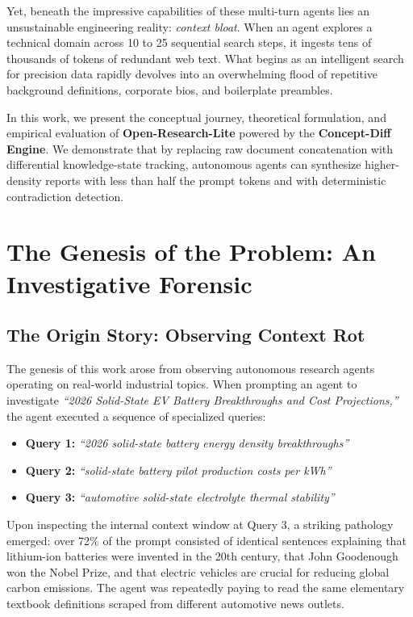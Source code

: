 \documentclass[10pt,twocolumn,letterpaper]{article}
\begin{document}
Yet, beneath the impressive capabilities of these multi-turn agents lies an unsustainable engineering reality: \textit{context bloat}. When an agent explores a technical domain across 10 to 25 sequential search steps, it ingests tens of thousands of tokens of redundant web text. What begins as an intelligent search for precision data rapidly devolves into an overwhelming flood of repetitive background definitions, corporate bios, and boilerplate preambles.

In this work, we present the conceptual journey, theoretical formulation, and empirical evaluation of \textbf{Open-Research-Lite} powered by the \textbf{Concept-Diff Engine}. We demonstrate that by replacing raw document concatenation with differential knowledge-state tracking, autonomous agents can synthesize higher-density reports with less than half the prompt tokens and with deterministic contradiction detection.

\section{The Genesis of the Problem: An Investigative Forensic}

\subsection{The Origin Story: Observing Context Rot}
The genesis of this work arose from observing autonomous research agents operating on real-world industrial topics. When prompting an agent to investigate \textit{``2026 Solid-State EV Battery Breakthroughs and Cost Projections,''} the agent executed a sequence of specialized queries:
\begin{itemize}
    \item \textbf{Query 1:} \textit{``2026 solid-state battery energy density breakthroughs''}
    \item \textbf{Query 2:} \textit{``solid-state battery pilot production costs per kWh''}
    \item \textbf{Query 3:} \textit{``automotive solid-state electrolyte thermal stability''}
\end{itemize}

Upon inspecting the internal context window at Query 3, a striking pathology emerged: over 72\% of the prompt consisted of identical sentences explaining that lithium-ion batteries were invented in the 20th century, that John Goodenough won the Nobel Prize, and that electric vehicles are crucial for reducing global carbon emissions. The agent was repeatedly paying to read the same elementary textbook definitions scraped from different automotive news outlets.
\end{document}
